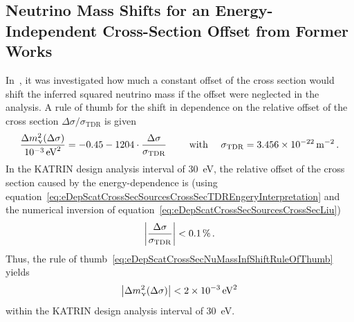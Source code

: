 \subsection{Neutrino Mass Shifts for an Energy-Independent Cross-Section Offset from Former Works}
\label{sec:eDepScatCrossSecNuMassInfGroh}
In~\cite{Groh2015}, it was investigated how much a constant offset of the cross section would shift the inferred squared neutrino mass if the offset were neglected in the analysis. A rule of thumb for the shift in dependence on the relative offset of the cross section $\Delta\sigma/\sigma_\mathrm{TDR}$ is given~\cite{Groh2015}
\begin{equation}
	\label{eq:eDepScatCrossSecNuMassInfShiftRuleOfThumb}
	\frac{\Delta m_\upnu^2(\Delta\sigma)}{\SI{e-3}{eV^2}} =
	-0.45
	-1204\cdot
	\frac{
		\Delta\sigma
	}{
		\sigma_\mathrm{TDR}
	}
	\qquad \text{ with } \quad 
	\sigma_\mathrm{TDR} = \SI{3.456e-22}{m^{-2}}
	\text{\,.}
\end{equation}
In the KATRIN design analysis interval of \SI{30}{eV}, the relative offset of the cross section caused by the energy-dependence is (using equation~\ref{eq:eDepScatCrossSecSourcesCrossSecTDREngeryInterpretation} and the numerical inversion of equation~\ref{eq:eDepScatCrossSecSourcesCrossSecLiu})
\begin{equation}
	\label{eq:eDepScatCrossSecNuMassInfRelativeCrossSecOffset}
	\left|
	\frac{
		\Delta\sigma
	}{
		\sigma_\mathrm{TDR}
	}
	\right| < \SI{0.1}{\percent}
	\text{\,.}
\end{equation}
Thus, the rule of thumb~\eqref{eq:eDepScatCrossSecNuMassInfShiftRuleOfThumb} yields
\begin{equation}
	\label{eq:eDepScatCrossSecNuMassInfShiftEstimate}
	\left|
		\Delta m_\upnu^2(\Delta\sigma)
	\right| < \SI{2e-3}{eV^2} 
\end{equation}
within the KATRIN design analysis interval of \SI{30}{eV}.

